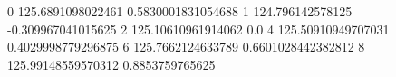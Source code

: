 0 125.6891098022461 0.5830001831054688
1 124.796142578125 -0.309967041015625
2 125.10610961914062 0.0
4 125.50910949707031 0.4029998779296875
6 125.7662124633789 0.6601028442382812
8 125.99148559570312 0.8853759765625
